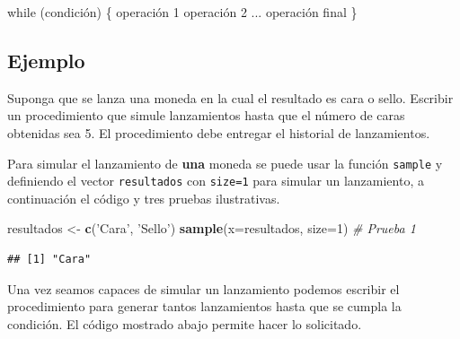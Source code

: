 \documentclass[10pt,]{krantz}
\makeatletter
\newenvironment{Shaded}{\begin{snugshade}}{\end{snugshade}}
\newcommand{\KeywordTok}[1]{\textcolor[rgb]{0.13,0.29,0.53}{\textbf{{#1}}}}
\newcommand{\DataTypeTok}[1]{\textcolor[rgb]{0.13,0.29,0.53}{{#1}}}
\newcommand{\DecValTok}[1]{\textcolor[rgb]{0.00,0.00,0.81}{{#1}}}
\newcommand{\StringTok}[1]{\textcolor[rgb]{0.31,0.60,0.02}{{#1}}}
\newcommand{\CommentTok}[1]{\textcolor[rgb]{0.56,0.35,0.01}{\textit{{#1}}}}
\newcommand{\NormalTok}[1]{{#1}}
\newenvironment{kframe}{%
\medskip{}
\setlength{\fboxsep}{.8em}
 \def\at@end@of@kframe{}%
 \ifinner\ifhmode%
  \def\at@end@of@kframe{\end{minipage}}%
  \begin{minipage}{\columnwidth}%
 \fi\fi%
 \def\FrameCommand##1{\hskip\@totalleftmargin \hskip-\fboxsep
 \colorbox{shadecolor}{##1}\hskip-\fboxsep
     \hskip-\linewidth \hskip-\@totalleftmargin \hskip\columnwidth}%
 \MakeFramed {\advance\hsize-\width
   \@totalleftmargin\z@ \linewidth\hsize
   \@setminipage}}%
 {\par\unskip\endMakeFramed%
 \at@end@of@kframe}
\renewenvironment{Shaded}{\begin{kframe}}{\end{kframe}}
\makeatother
\begin{document}
\begin{Shaded}
\begin{Highlighting}[]
\NormalTok{while (condición) \{}
  \NormalTok{operación }\DecValTok{1}
  \NormalTok{operación }\DecValTok{2}
  \NormalTok{...}
  \NormalTok{operación final}
\NormalTok{\}}
\end{Highlighting}
\end{Shaded}

\subsection*{Ejemplo}\label{ejemplo-18}


Suponga que se lanza una moneda en la cual el resultado es cara o sello.
Escribir un procedimiento que simule lanzamientos hasta que el número de
caras obtenidas sea 5. El procedimiento debe entregar el historial de
lanzamientos.

Para simular el lanzamiento de \textbf{una} moneda se puede usar la
función \texttt{sample} y definiendo el vector \texttt{resultados} con
\texttt{size=1} para simular un lanzamiento, a continuación el código y
tres pruebas ilustrativas.

\begin{Shaded}
\begin{Highlighting}[]
\NormalTok{resultados <-}\StringTok{ }\KeywordTok{c}\NormalTok{(}\StringTok{'Cara'}\NormalTok{, }\StringTok{'Sello'}\NormalTok{)}
\KeywordTok{sample}\NormalTok{(}\DataTypeTok{x=}\NormalTok{resultados, }\DataTypeTok{size=}\DecValTok{1}\NormalTok{)  }\CommentTok{# Prueba 1}
\end{Highlighting}
\end{Shaded}

\begin{verbatim}
## [1] "Cara"
\end{verbatim}

Una vez seamos capaces de simular un lanzamiento podemos escribir el
procedimiento para generar tantos lanzamientos hasta que se cumpla la
condición. El código mostrado abajo permite hacer lo solicitado.
\end{document}
